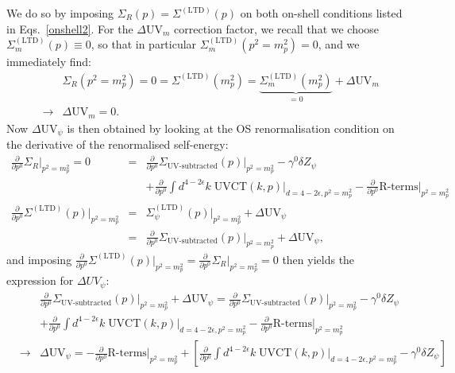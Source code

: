 \documentclass[11pt]{article}
\begin{document}
We do so by imposing $\Sigma_R(p)=\Sigma^{(\textrm{LTD})}(p)$ on both on-shell conditions listed in Eqs.~\eqref{onshell2}. For the $\Delta \textrm{UV}_m$ correction factor, we recall that we choose $ \Sigma^{(\textrm{LTD})}_{m} (p) \equiv 0$, so that in particular $\Sigma^{(\textrm{LTD})}_{m} (p^2=m_p^2)=0 $, and we immediately find:
\begin{eqnarray}
&&\Sigma_R(p^2=m_p^2) = 0 = \Sigma^{(\textrm{LTD})}(m_p^2)  = \underbrace{\Sigma^{(\textrm{LTD})}_{m} (m_p^2)}_{=0} + \Delta \textrm{UV}_m \nonumber \\
&\rightarrow& \Delta \textrm{UV}_m = 0.
\end{eqnarray}
Now $\Delta\textrm{UV}_\psi$ is then obtained by looking at the OS renormalisation condition on the derivative of the renormalised self-energy:
\begin{eqnarray}
\frac{\partial}{\partial p^0} \Sigma_R \Big|_{p^2=m_p^2} = 0 &=& 
\frac{\partial}{\partial p^0} \Sigma_{\textrm{UV-subtracted}}(p) {\Big|}_{p^2=m_p^2}
- \gamma^0 \delta Z_\psi  \nonumber\\
&&
+ \frac{\partial}{\partial p^0}\int d^{4-2\epsilon}k\; \textrm{UVCT}(k,p){\Big |}_{d=4-2\epsilon, p^2=m_p^2 }  -\frac{\partial}{\partial p^0}\textrm{R-terms}|_{p^2=m_p^2}  \nonumber \\
\frac{\partial}{\partial p^0} \Sigma^{(\textrm{LTD})}(p) {\Big|}_{p^2=m_p^2} &=& 
\Sigma^{(\textrm{LTD})}_{\psi} (p) {\Big|}_{p^2=m_p^2} + \Delta \textrm{UV}_\psi  \nonumber \\
&=& \frac{\partial}{\partial p^0} \Sigma_{\textrm{UV-subtracted}}(p){\Big|}_{p^2=m_p^2} + \Delta \textrm{UV}_\psi,
\end{eqnarray}
and imposing $\frac{\partial}{\partial p^0} \Sigma^{(\textrm{LTD})}(p) {\Big|}_{p^2=m_p^2} = \frac{\partial}{\partial p^0} \Sigma_R \Big|_{p^2=m_p^2}  = 0$ then yields the expression for $\Delta UV_\psi$:
\begin{eqnarray}
&& \frac{\partial}{\partial p^0} \Sigma_{\textrm{UV-subtracted}}(p){\Big|}_{p^2=m_p^2} + \Delta \textrm{UV}_\psi =
\frac{\partial}{\partial p^0} \Sigma_{\textrm{UV-subtracted}}(p) {\Big|}_{p^2=m_p^2}
- \gamma^0 \delta Z_\psi  \nonumber\\
&&
+ \frac{\partial}{\partial p^0}\int d^{4-2\epsilon}k\; \textrm{UVCT}(k,p){\Big |}_{d=4-2\epsilon, p^2=m_p^2 }  -\frac{\partial}{\partial p^0}\textrm{R-terms}|_{p^2=m_p^2}  \nonumber \\
&\rightarrow& \Delta \textrm{UV}_\psi = -\frac{\partial}{\partial p^0}\textrm{R-terms}|_{p^2=m_p^2}  + \left[
\frac{\partial}{\partial p^0} \int d^{4-2\epsilon}k\; \textrm{UVCT}(k,p){\Big |}_{d=4-2\epsilon, p^2=m_p^2 }
- \gamma^0 \delta Z_\psi
\right ] \nonumber \\
\label{eq:DeltaUVpsidef}
\end{eqnarray}
\end{document}
